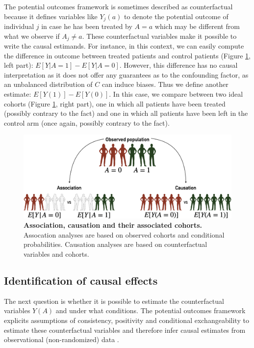 \documentclass[a4paper,12pt,twoside,onecolumn,openright,final,oldfontcommands]{memoir}
\begin{document}
The potential outcomes framework is sometimes described as
counterfactual because it defines variables like \(Y_j(a)\) to denote
the potential outcome of individual \(j\) in case he has been treated by
\(A=a\) which may be different from what we observe if \(A_j\neq a\).
These counterfactual variables make it possible to write the causal
estimands. For instance, in this context, we can easily compute the
difference in outcome between treated patients and control patients
(Figure \ref{fig:causality}, left part): \(E[Y | A=1] - E[Y | A=0].\)
However, this difference has no causal interpretation as it does not
offer any guarantees as to the confounding factor, as an unbalanced
distribution of \(C\) can induce biases. Thus we define another
estimate: \(E[Y(1)] - E[Y(0)].\) In this case, we compare between two
ideal cohorts (Figure \ref{fig:causality}, right part), one in which all
patients have been treated (possibly contrary to the fact) and one in
which all patients have been left in the control arm (once again,
possibly contrary to the fact).

\begin{figure}

{\centering \includegraphics[width=0.9\linewidth]{fig/causality} 

}

\caption[Association and causation]{\textbf{Association, causation and their
associated cohorts.} Assocation analyses are based on observed cohorts
and conditional probabilities. Causation analyses are based on
counterfactual variables and cohorts.}\label{fig:causality}
\end{figure}






\subsection{Identification of causal
effects}\label{identification-of-causal-effects}

The next question is whether it is possible to estimate the
counterfactual variables \(Y(A)\) and under what conditions. The
potential outcomes framework explicits assumptions of consistency,
positivity and conditional exchangeability to estimate these
counterfactual variables and therefore infer causal estimates from
observational (non-randomized) data
\citep[\citet{hernan2020causal}]{rubin1974estimating}.
\end{document}
